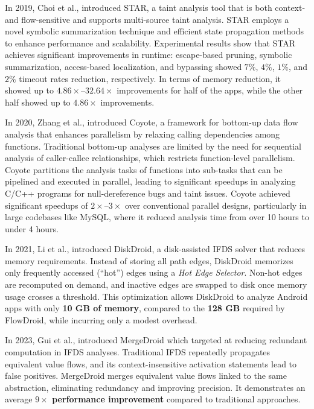 In 2019, Choi et al., introduced STAR, a taint analysis tool that is both context- and flow-sensitive and supports multi-source taint analysis. STAR employs a novel symbolic summarization technique and efficient state propagation methods to enhance performance and scalability. Experimental results show that STAR achieves significant improvements in runtime: escape-based pruning, symbolic summarization, access-based localization, and bypassing showed $7\%$, $4\%$, $1\%$, and $2\%$ timeout rates reduction, respectively. In terms of memory reduction, it showed up to $4.86\times$--$32.64\times$ improvements for half of the apps, while the other half showed up to $4.86\times$ improvements.

In 2020, Zhang et al., introduced Coyote, a framework for bottom-up data flow analysis that enhances parallelism by relaxing calling dependencies among functions. Traditional bottom-up analyses are limited by the need for sequential analysis of caller-callee relationships, which restricts function-level parallelism. Coyote partitions the analysis tasks of functions into sub-tasks that can be pipelined and executed in parallel, leading to significant speedups in analyzing C/C++ programs for null-dereference bugs and taint issues. Coyote achieved significant speedups of $2\times$--$3\times$ over conventional parallel designs, particularly in large codebases like MySQL, where it reduced analysis time from over 10 hours to under 4 hours.

In 2021, Li et al., introduced DiskDroid, a disk-assisted IFDS solver that reduces memory requirements. Instead of storing all path edges, DiskDroid memorizes only frequently accessed (“hot”) edges using a \emph{Hot Edge Selector}. Non-hot edges are recomputed on demand, and inactive edges are swapped to disk once memory usage crosses a threshold. This optimization allows DiskDroid to analyze Android apps with only \textbf{10 GB of memory}, compared to the \textbf{128 GB} required by FlowDroid, while incurring only a modest overhead.

In 2023, Gui et al., introduced MergeDroid which targeted at reducing redundant computation in IFDS analyses. Traditional IFDS repeatedly propagates equivalent value flows, and its context-insensitive activation statements lead to false positives. MergeDroid merges equivalent value flows linked to the same abstraction, eliminating redundancy and improving precision. It demonstrates an average \textbf{$9\times$ performance improvement} compared to traditional approaches.

